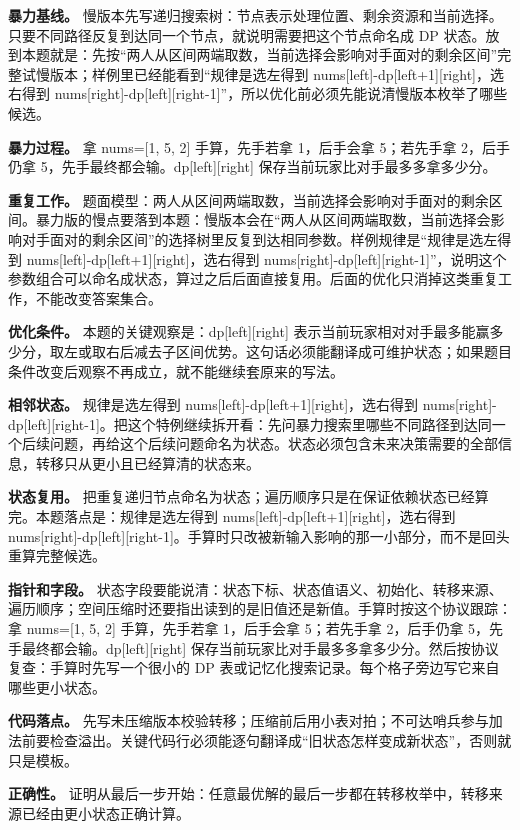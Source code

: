 \textbf{暴力基线。} 慢版本先写递归搜索树：节点表示处理位置、剩余资源和当前选择。只要不同路径反复到达同一个节点，就说明需要把这个节点命名成 DP 状态。放到本题就是：先按“两人从区间两端取数，当前选择会影响对手面对的剩余区间”完整试慢版本；样例里已经能看到“规律是选左得到 nums[left]-dp[left+1][right]，选右得到 nums[right]-dp[left][right-1]”，所以优化前必须先能说清慢版本枚举了哪些候选。

\textbf{暴力过程。} 拿 nums=[1, 5, 2] 手算，先手若拿 1，后手会拿 5；若先手拿 2，后手仍拿 5，先手最终都会输。dp[left][right] 保存当前玩家比对手最多多拿多少分。

\textbf{重复工作。} 题面模型：两人从区间两端取数，当前选择会影响对手面对的剩余区间。暴力版的慢点要落到本题：慢版本会在“两人从区间两端取数，当前选择会影响对手面对的剩余区间”的选择树里反复到达相同参数。样例规律是“规律是选左得到 nums[left]-dp[left+1][right]，选右得到 nums[right]-dp[left][right-1]”，说明这个参数组合可以命名成状态，算过之后后面直接复用。后面的优化只消掉这类重复工作，不能改变答案集合。

\textbf{优化条件。} 本题的关键观察是：dp[left][right] 表示当前玩家相对对手最多能赢多少分，取左或取右后减去子区间优势。这句话必须能翻译成可维护状态；如果题目条件改变后观察不再成立，就不能继续套原来的写法。

\textbf{相邻状态。} 规律是选左得到 nums[left]-dp[left+1][right]，选右得到 nums[right]-dp[left][right-1]。把这个特例继续拆开看：先问暴力搜索里哪些不同路径到达同一个后续问题，再给这个后续问题命名为状态。状态必须包含未来决策需要的全部信息，转移只从更小且已经算清的状态来。

\textbf{状态复用。} 把重复递归节点命名为状态；遍历顺序只是在保证依赖状态已经算完。本题落点是：规律是选左得到 nums[left]-dp[left+1][right]，选右得到 nums[right]-dp[left][right-1]。手算时只改被新输入影响的那一小部分，而不是回头重算完整候选。

\textbf{指针和字段。} 状态字段要能说清：状态下标、状态值语义、初始化、转移来源、遍历顺序；空间压缩时还要指出读到的是旧值还是新值。手算时按这个协议跟踪：拿 nums=[1, 5, 2] 手算，先手若拿 1，后手会拿 5；若先手拿 2，后手仍拿 5，先手最终都会输。dp[left][right] 保存当前玩家比对手最多多拿多少分。然后按协议复查：手算时先写一个很小的 DP 表或记忆化搜索记录。每个格子旁边写它来自哪些更小状态。

\textbf{代码落点。} 先写未压缩版本校验转移；压缩前后用小表对拍；不可达哨兵参与加法前要检查溢出。关键代码行必须能逐句翻译成“旧状态怎样变成新状态”，否则就只是模板。

\textbf{正确性。} 证明从最后一步开始：任意最优解的最后一步都在转移枚举中，转移来源已经由更小状态正确计算。

